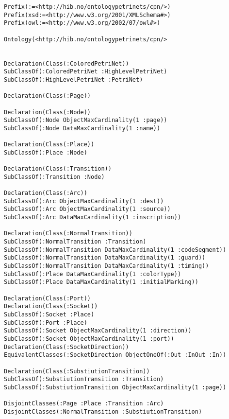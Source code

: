 \begin{lstlisting}[label=lst:cpn.owl,caption=The CPN Ontology] 
Prefix(:=<http://hib.no/ontologypetrinets/cpn/>)
Prefix(xsd:=<http://www.w3.org/2001/XMLSchema#>)
Prefix(owl:=<http://www.w3.org/2002/07/owl#>)
 
Ontology(<http://hib.no/ontologypetrinets/cpn/>
 

Declaration(Class(:ColoredPetriNet))
SubClassOf(:ColoredPetriNet :HighLevelPetriNet)
SubClassOf(:HighLevelPetriNet :PetriNet)

Declaration(Class(:Page))

Declaration(Class(:Node))
SubClassOf(:Node ObjectMaxCardinality(1 :page))
SubClassOf(:Node DataMaxCardinality(1 :name))

Declaration(Class(:Place))
SubClassOf(:Place :Node)

Declaration(Class(:Transition))
SubClassOf(:Transition :Node)

Declaration(Class(:Arc))
SubClassOf(:Arc ObjectMaxCardinality(1 :dest))
SubClassOf(:Arc ObjectMaxCardinality(1 :source))
SubClassOf(:Arc DataMaxCardinality(1 :inscription))

Declaration(Class(:NormalTransition))
SubClassOf(:NormalTransition :Transition)
SubClassOf(:NormalTransition DataMaxCardinality(1 :codeSegment))
SubClassOf(:NormalTransition DataMaxCardinality(1 :guard))
SubClassOf(:NormalTransition DataMaxCardinality(1 :timing))
SubClassOf(:Place DataMaxCardinality(1 :colorType))
SubClassOf(:Place DataMaxCardinality(1 :initialMarking))

Declaration(Class(:Port))
Declaration(Class(:Socket))
SubClassOf(:Socket :Place)
SubClassOf(:Port :Place)
SubClassOf(:Socket ObjectMaxCardinality(1 :direction))
SubClassOf(:Socket ObjectMaxCardinality(1 :port))
Declaration(Class(:SocketDirection))
EquivalentClasses(:SocketDirection ObjectOneOf(:Out :InOut :In))

Declaration(Class(:SubstiutionTransition))
SubClassOf(:SubstiutionTransition :Transition)
SubClassOf(:SubstiutionTransition ObjectMaxCardinality(1 :page))

DisjointClasses(:Page :Place :Transition :Arc)
DisjointClasses(:NormalTransition :SubstiutionTransition)


\end{lstlisting}
